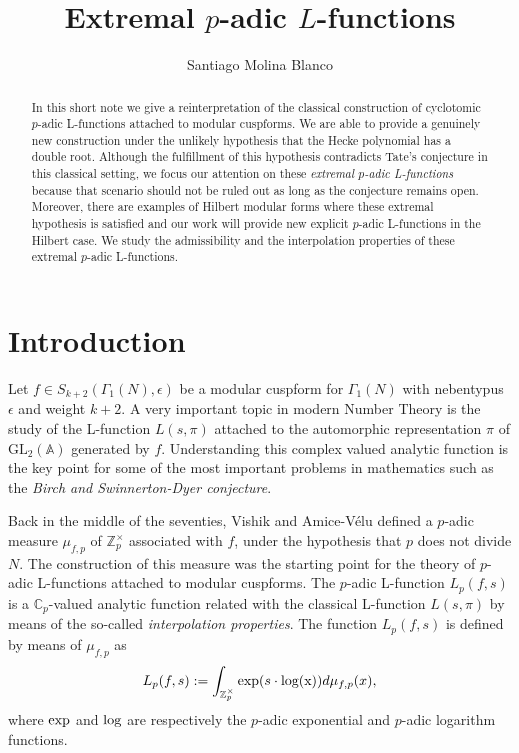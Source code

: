\documentclass{amsart}
\title{Extremal $p$-adic $L$-functions}
\author{Santiago Molina Blanco}
\newcommand{\GL}{{\mathrm{GL}}}
\newcommand{\Z}{{\mathbb Z}}
\newcommand{\A}{{\mathbb A}}
\newcommand{\C}{{\mathbb C}}
\begin{document}


\maketitle

\begin{abstract}
In this short note we give a reinterpretation of the classical construction of cyclotomic $p$-adic L-functions attached to modular cuspforms. We are able to provide a genuinely new construction under the unlikely hypothesis that the Hecke polynomial has a double root. Although the fulfillment of this hypothesis contradicts Tate's conjecture in this classical setting, we focus our attention on these \emph{extremal $p$-adic L-functions} because that scenario should not be ruled out as long as the conjecture remains open. Moreover, there are examples of Hilbert modular forms where these extremal hypothesis is satisfied and our work will provide new explicit $p$-adic L-functions in the Hilbert case.
We study the admissibility and the interpolation properties of these extremal $p$-adic L-functions. 
\end{abstract}

\tableofcontents

\section{Introduction}

Let $f\in S_{k+2}(\Gamma_1(N),\epsilon)$ be a modular cuspform for $\Gamma_1(N)$ with nebentypus $\epsilon$ and weight $k+2$. A very important topic in modern Number Theory is the study of the L-function $L(s,\pi)$ attached to the automorphic representation $\pi$ of $\GL_2(\A)$ generated by $f$. Understanding this complex valued analytic function is the key point for some of the most important problems in mathematics such as the \emph{Birch and Swinnerton-Dyer conjecture}.%

Back in the middle of the seventies, Vishik \cite{Vis} and Amice-V\'elu \cite{A-V} defined a $p$-adic measure $\mu_{f,p}$ of $\Z_p^\times$ associated with $f$, under the hypothesis that $p$ does not divide $N$. 
The construction of this measure was the starting point for the theory of $p$-adic L-functions attached to modular cuspforms. 
The $p$-adic L-function $L_p(f,s)$ %
is a $\C_p$-valued analytic function related with the classical L-function $L(s,\pi)$ by means of the so-called \emph{interpolation properties}. The function $L_p(f,s)$ is defined by means of $\mu_{f,p}$ as
\[
L_p(f,s):=\int_{\Z_p^\times}{\rm exp}(s\cdot{\rm log(x)})d\mu_{f,p}(x),
\]
where ${\rm exp}$ and ${\rm log}$ are respectively the $p$-adic exponential and $p$-adic logarithm functions.
\end{document}
